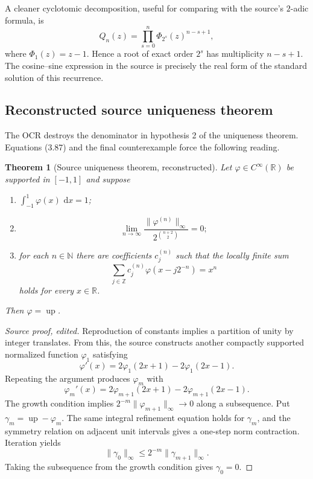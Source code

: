 \documentclass[11pt,oneside]{article}
\numberwithin{equation}{section}
\newtheorem{theorem}{Theorem}[section]
\theoremstyle{definition}
\theoremstyle{remark}
\newcommand{\R}{\mathbb R}
\newcommand{\N}{\mathbb N}
\newcommand{\Z}{\mathbb Z}
\newcommand{\Up}{\operatorname{up}}
\newcommand{\dd}{\,\mathrm d}
\begin{document}
A cleaner cyclotomic decomposition, useful for comparing with the source's
$2$-adic formula, is
\begin{equation}\label{p6:eq:Qn-cyclotomic}
 Q_n(z)=\prod_{s=0}^{n}\Phi_{2^s}(z)^{n-s+1},
\end{equation}
where $\Phi_1(z)=z-1$.  Hence a root of exact order $2^s$ has multiplicity
$n-s+1$.  The cosine--sine expression in the source is precisely the real form
of the standard solution of this recurrence.

\subsection{Reconstructed source uniqueness theorem}

The OCR destroys the denominator in hypothesis 2 of the uniqueness theorem.
Equations (3.87) and the final counterexample force the following reading.

\begin{theorem}[Source uniqueness theorem, reconstructed]\label{p6:thm:source-uniqueness}
Let $\varphi\in C^\infty(\R)$ be supported in $[-1,1]$ and suppose
\begin{enumerate}
\item $\int_{-1}^{1}\varphi(x)\,\dd x=1$;
\item
\begin{equation}\label{p6:eq:source-growth-condition}
 \lim_{n\to\infty}
 \frac{\|\varphi^{(n)}\|_\infty}
 {2^{\binom{n+2}{2}}}=0;
\end{equation}
\item for each $n\in\N$ there are coefficients $c_j^{(n)}$ such that the locally
finite sum
\[
 \sum_{j\in\Z}c_j^{(n)}\varphi(x-j2^{-n})=x^n
\]
holds for every $x\in\R$.
\end{enumerate}
Then $\varphi=\Up$.
\end{theorem}

\begin{proof}[Source proof, edited]
Reproduction of constants implies a partition of unity by integer translates.
From this, the source constructs another compactly supported normalized function
$\varphi_1$ satisfying
\[
 \varphi'(x)=2\varphi_1(2x+1)-2\varphi_1(2x-1).
\]
Repeating the argument produces $\varphi_m$ with
\begin{equation}\label{p6:eq:phi-chain}
 \varphi_m'(x)=2\varphi_{m+1}(2x+1)-2\varphi_{m+1}(2x-1).
\end{equation}
The growth condition implies
$2^{-m}\|\varphi_{m+1}\|_\infty\to0$ along a subsequence.  Put
$\gamma_m=\Up-\varphi_m$.  The same integral refinement equation holds for
$\gamma_m$, and the symmetry relation on adjacent unit intervals gives a
one-step norm contraction.  Iteration yields
\[
 \|\gamma_0\|_\infty\le2^{-m}\|\gamma_{m+1}\|_\infty.
\]
Taking the subsequence from the growth condition gives $\gamma_0=0$.
\end{proof}
\end{document}
